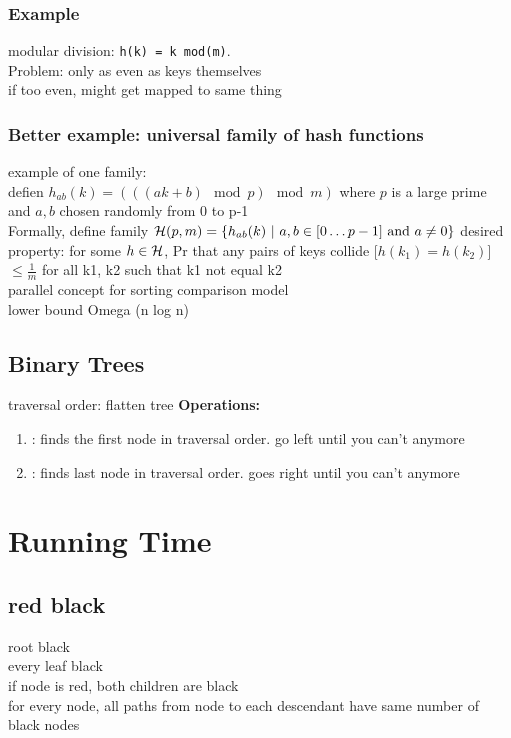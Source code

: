 \documentclass{article}
\begin{document}
\subsubsection{Example}
modular division: \verb|h(k) = k mod(m)|.\\
Problem: only as even as keys themselves\\
if too even, might get mapped to same thing\\
\subsubsection{Better example: universal family of hash functions}
example of one family:\\
defien $h_{ab}(k) = (((ak +b)\mod p)\mod m)$ where $p$ is a large prime and 
$a,b$ chosen randomly from 0 to p-1\\
Formally, define family $\mathcal{H}(p, m) = \{h_{ab}(k) ~|~ a, b \in [0 \dots p-1] \text{ and } a \neq 0 \}$
desired property: for some $h \in \mathcal{H}$, Pr that any pairs of keys collide [$h(k_1)= h(k_2)$] $\leq \frac{1}{m}$ for all k1, k2 such that k1 not equal k2 
\\
parallel concept for sorting comparison model\\
lower bound Omega (n log n)
\subsection{Binary Trees}
traversal order: flatten tree
\textbf{Operations: }
\begin{enumerate}
    \item {}: finds the first node in traversal order. go left until you can't anymore
    \item {}: finds last node in traversal order. goes right until you can't anymore 
\end{enumerate}
\section{Running Time}
\subsection{red black}
root black\\
every leaf black\\
if node is red, both children are black\\
for every node, all paths from node to each descendant have same number of black nodes
\end{document}
